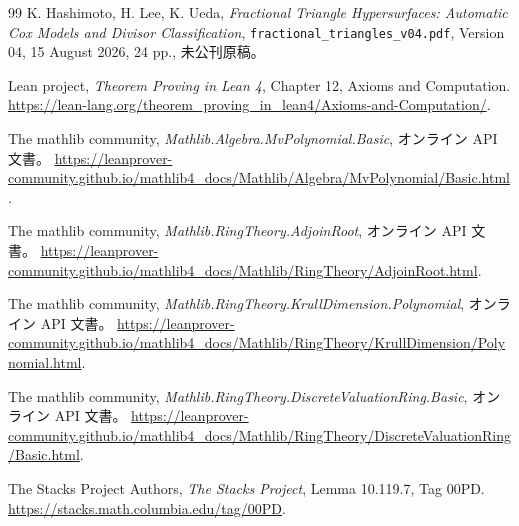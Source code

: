 \documentclass[11pt,a4paper]{ltjsarticle}
\numberwithin{equation}{section}
\theoremstyle{definition}
\begin{document}
\begin{thebibliography}{99}
K. Hashimoto, H. Lee, K. Ueda,
\emph{Fractional Triangle Hypersurfaces: Automatic Cox Models and Divisor Classification},
\texttt{fractional\_triangles\_v04.pdf}, Version 04, 15 August 2026, 24 pp., 未公刊原稿。

Lean project, \emph{Theorem Proving in Lean 4}, Chapter 12, Axioms and Computation.
\url{https://lean-lang.org/theorem_proving_in_lean4/Axioms-and-Computation/}.

The mathlib community, \emph{Mathlib.Algebra.MvPolynomial.Basic}, オンライン API 文書。
\url{https://leanprover-community.github.io/mathlib4_docs/Mathlib/Algebra/MvPolynomial/Basic.html}.

The mathlib community, \emph{Mathlib.RingTheory.AdjoinRoot}, オンライン API 文書。
\url{https://leanprover-community.github.io/mathlib4_docs/Mathlib/RingTheory/AdjoinRoot.html}.

The mathlib community, \emph{Mathlib.RingTheory.KrullDimension.Polynomial}, オンライン API 文書。
\url{https://leanprover-community.github.io/mathlib4_docs/Mathlib/RingTheory/KrullDimension/Polynomial.html}.

The mathlib community, \emph{Mathlib.RingTheory.DiscreteValuationRing.Basic}, オンライン API 文書。
\url{https://leanprover-community.github.io/mathlib4_docs/Mathlib/RingTheory/DiscreteValuationRing/Basic.html}.

The Stacks Project Authors, \emph{The Stacks Project}, Lemma 10.119.7, Tag 00PD.
\url{https://stacks.math.columbia.edu/tag/00PD}.
\end{thebibliography}
\end{document}
